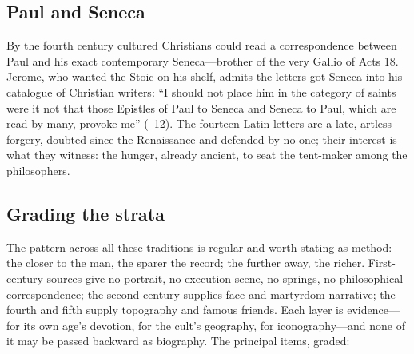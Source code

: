 \subsection{Paul and Seneca}

By the fourth century cultured Christians could read a correspondence
between Paul and his exact contemporary Seneca---brother of the very
Gallio of Acts 18. Jerome, who wanted the Stoic on his shelf, admits the
letters got Seneca into his catalogue of Christian writers: ``I should
not place him in the category of saints were it not that those Epistles
of Paul to Seneca and Seneca to Paul, which are read by many, provoke
me'' (~12). The fourteen Latin letters are a
late, artless forgery, doubted since the Renaissance and defended by no
one; their interest is what they witness: the hunger, already ancient, to
seat the tent-maker among the philosophers.

\subsection{Grading the strata}

The pattern across all these traditions is regular and worth stating as
method: the closer to the man, the sparer the record; the further away,
the richer. First-century sources give no portrait, no execution scene,
no springs, no philosophical correspondence; the second century supplies
face and martyrdom narrative; the fourth and fifth supply topography and
famous friends. Each layer is evidence---for its own age's devotion, for
the cult's geography, for iconography---and none of it may be passed
backward as biography. The principal items, graded:

